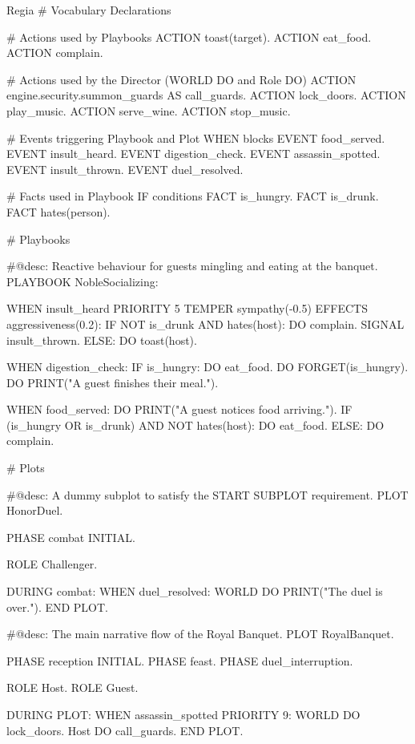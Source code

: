 \begin{codeblock}[title=Regia DSL Example]{Regia}
# Vocabulary Declarations

# Actions used by Playbooks
ACTION toast(target).
ACTION eat_food.
ACTION complain.

# Actions used by the Director (WORLD DO and Role DO)
ACTION engine.security.summon_guards AS call_guards.
ACTION lock_doors.
ACTION play_music.
ACTION serve_wine.
ACTION stop_music.

# Events triggering Playbook and Plot WHEN blocks
EVENT food_served.
EVENT insult_heard.
EVENT digestion_check.
EVENT assassin_spotted.
EVENT insult_thrown.
EVENT duel_resolved.

# Facts used in Playbook IF conditions
FACT is_hungry.
FACT is_drunk.
FACT hates(person).

# Playbooks

#@desc: Reactive behaviour for guests mingling and eating at the banquet.
PLAYBOOK NobleSocializing:

    WHEN insult_heard PRIORITY 5 TEMPER sympathy(-0.5) EFFECTS aggressiveness(0.2):
        IF NOT is_drunk AND hates(host):
            DO complain.
            SIGNAL insult_thrown.
        ELSE:
            DO toast(host).

    WHEN digestion_check:
        IF is_hungry:
            DO eat_food.
            DO FORGET(is_hungry).
            DO PRINT("A guest finishes their meal.").

    WHEN food_served:
        DO PRINT("A guest notices food arriving.").
        IF (is_hungry OR is_drunk) AND NOT hates(host):
            DO eat_food.
        ELSE:
            DO complain.

# Plots

#@desc: A dummy subplot to satisfy the START SUBPLOT requirement.
PLOT HonorDuel.

    PHASE combat INITIAL.

    ROLE Challenger.

    DURING combat:
        WHEN duel_resolved:
            WORLD DO PRINT("The duel is over.").
            END PLOT.

#@desc: The main narrative flow of the Royal Banquet.
PLOT RoyalBanquet.

    PHASE reception INITIAL.
    PHASE feast.
    PHASE duel_interruption.

    ROLE Host.
    ROLE Guest.

    DURING PLOT:
        WHEN assassin_spotted PRIORITY 9:
            WORLD DO lock_doors.
            Host DO call_guards.
            END PLOT.


\end{codeblock}
